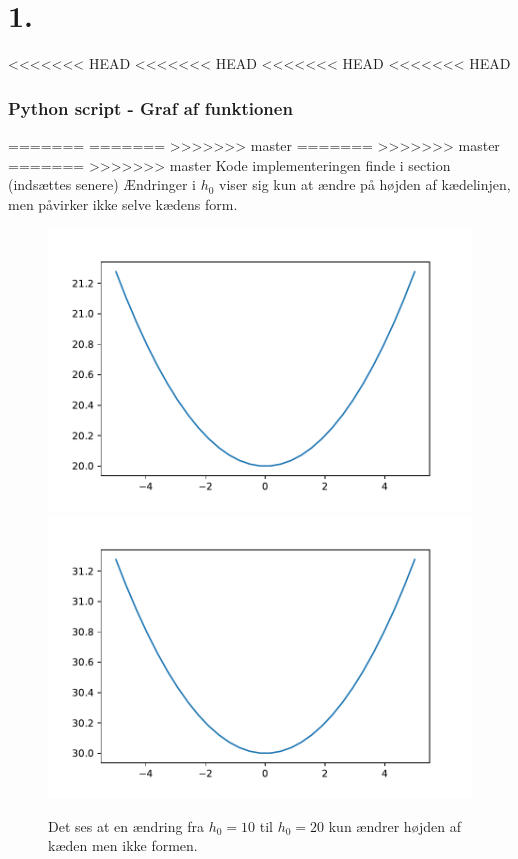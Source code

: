 \section*{1.}
<<<<<<< HEAD
<<<<<<< HEAD
<<<<<<< HEAD
<<<<<<< HEAD
% 
\subsubsection*{Python script - Graf af funktionen}
%

%
=======
=======
>>>>>>> master
=======
>>>>>>> master
=======
>>>>>>> master
Kode implementeringen finde i section (indsættes senere)
% 
Ændringer i $h_0$ viser sig kun at ændre på højden af kædelinjen, men påvirker ikke selve kædens form.

\begin{figure}[h!]
\includegraphics[scale=0.5]{code/fig1}
\includegraphics[scale=0.5]{code/fig2}
\caption{Det ses at en ændring fra $h_0=10$ til $h_0=20$ kun ændrer højden af kæden men ikke formen.}
\end{figure}



